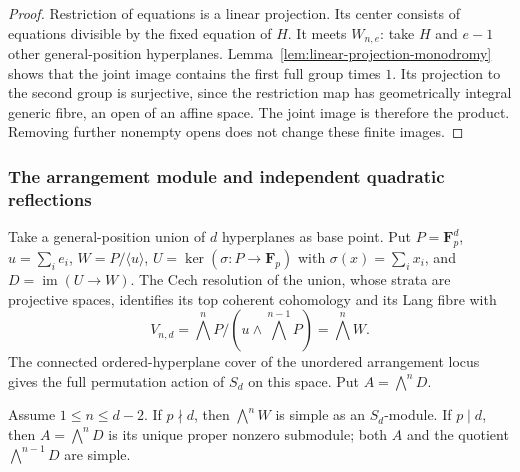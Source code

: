 \begin{proof}
Restriction of equations is a linear projection.  Its center
consists of equations divisible by the fixed equation of $H$.
It meets $W_{n,e}$: take $H$ and $e-1$ other general-position
hyperplanes.  Lemma~\ref{lem:linear-projection-monodromy} shows
that the joint image contains the first full group times $1$.
Its projection to the second group is surjective, since the
restriction map has geometrically integral generic fibre, an
open of an affine space.  The joint image is therefore the
product.  Removing further nonempty opens does not change
these finite images.
\end{proof}

\subsubsection{The arrangement module and independent quadratic reflections}

Take a general-position union of $d$ hyperplanes as base point.
Put $P=\mathbf F_p^d$, $u=\sum_i e_i$, $W=P/\langle u\rangle$,
$U=\ker(\sigma:P\to\mathbf F_p)$ with $\sigma(x)=\sum_i x_i$,
and $D=\operatorname{im}(U\to W)$.  The Cech resolution of the
union, whose strata are projective spaces, identifies its top
coherent cohomology and its Lang fibre with
\begin{equation}\label{eq:pn-arrangement-module}
 V_{n,d}=\bigwedge^nP/(u\wedge\bigwedge^{n-1}P)
       =\bigwedge^nW.
\end{equation}
The connected ordered-hyperplane cover of the unordered
arrangement locus gives the full permutation action of $S_d$
on this space.  Put $A=\bigwedge^nD$.

\begin{lemma}\label{lem:odd-general-hook-module}
Assume $1\leq n\leq d-2$.  If $p\nmid d$, then
$\bigwedge^nW$ is simple as an $S_d$-module.  If $p\mid d$, then
$A=\bigwedge^nD$ is its unique proper nonzero submodule; both
$A$ and the quotient $\bigwedge^{n-1}D$ are simple.
\end{lemma}

